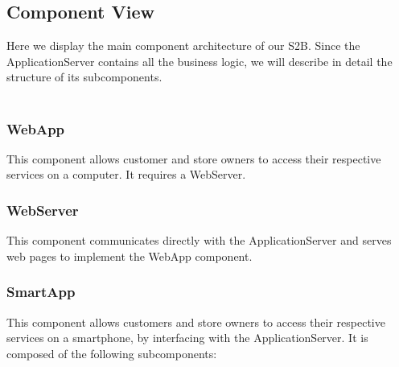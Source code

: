 \subsection{Component View}
Here we display the main component architecture of our S2B. Since the ApplicationServer contains all the business logic, we will describe in detail the structure of its subcomponents.\\\\
\begin{figure}[H]
	\noindent
\end{figure}


\subsubsection{WebApp}
This component allows customer and store owners to access their respective services on a computer. It requires a WebServer.
\subsubsection{WebServer}
This component communicates directly with the ApplicationServer and serves web pages to implement the WebApp component.
\subsubsection{SmartApp}
This component allows customers and store owners to access their respective services on a smartphone, by interfacing with the ApplicationServer. It is composed of the following subcomponents:
